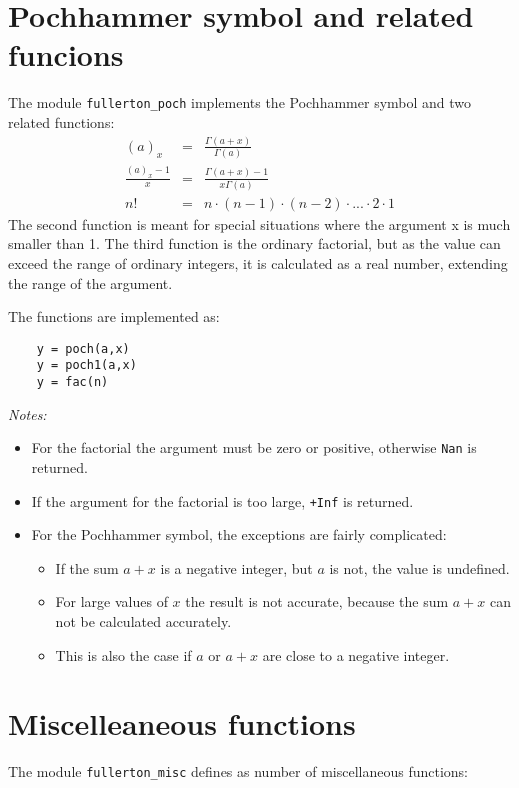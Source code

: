 \documentclass{article}
\begin{document}
\section{Pochhammer symbol and related funcions}
The module \verb+fullerton_poch+ implements the Pochhammer symbol and two related functions:
\begin{eqnarray}
    (a)_x             &=& \frac{\Gamma(a+x)}{\Gamma(a)} \\
    \frac{(a)_x-1}{x} &=& \frac{\Gamma(a+x)-1}{ x \Gamma(a)} \\
    n!                &=& n \cdot (n-1) \cdot (n-2) \cdot ... \cdot 2 \cdot 1
\end{eqnarray}
The second function is meant for special situations where the argument x is much smaller than 1.
The third function is the ordinary factorial, but as the value can exceed the range of ordinary integers,
it is calculated as a real number, extending the range of the argument.

The functions are implemented as:
\begin{verbatim}
    y = poch(a,x)
    y = poch1(a,x)
    y = fac(n)
\end{verbatim}

\emph{Notes:}
\begin{itemize}
\item
For the factorial the argument must be zero or positive, otherwise \verb+Nan+ is returned.
\item
If the argument for the factorial is too large, \verb~+Inf~ is returned.
\item
For the Pochhammer symbol, the exceptions are fairly complicated:
    \begin{itemize}
    \item If the sum $a+x$ is a negative integer, but $a$ is not, the value is undefined.
    \item For large values of $x$ the result is not accurate, because the sum $a+x$ can not be calculated accurately.
    \item This is also the case if $a$ or $a+x$ are close to a negative integer.
    \end{itemize}

\end{itemize}


\section{Miscelleaneous functions}
The module \verb+fullerton_misc+ defines as number of miscellaneous functions:
\end{document}

